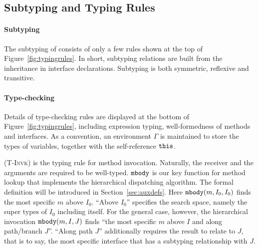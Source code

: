 \subsection{Subtyping and Typing Rules}\label{subsec:typingrules}
\paragraph{Subtyping}
The subtyping of \MIM{} consists of only a few rules shown at the top of Figure~\ref{fig:typingrules}.
In short, subtyping relations are built from the inheritance in interface
declarations. Subtyping is both symmetric, reflexive and transitive.

\paragraph{Type-checking}
Details of type-checking rules are displayed at the bottom of Figure~\ref{fig:typingrules}, including expression
typing, well-formedness of methods and interfaces. As a convention, an environment
$\Gamma$ is maintained to store the types of variables, together with
the self-reference $\texttt{this}$.

\textsc{(T-Invk)} is the typing rule for method invocation.
Naturally, the receiver and the arguments are required to be well-typed.
$\texttt{mbody}$ is our key function for method lookup that implements the
hierarchical dispatching algorithm. The formal definition will be introduced in Section~\ref{sec:auxdefs}.
Here $\texttt{mbody}(m, I_0, I_0)$ finds the most specific $m$ above $I_0$. ``Above $I_0$'' specifies
the search space, namely the super types of $I_0$ including itself.
For the general case, however, the hierarchical invocation $\texttt{mbody}(m, I, J)$ finds ``the most specific $m$
above $I$ and along path/branch $J$''. ``Along path $J$'' additionally requires the result to relate to $J$, that is to say,
the most specific interface that has a subtyping relationship with $J$.

